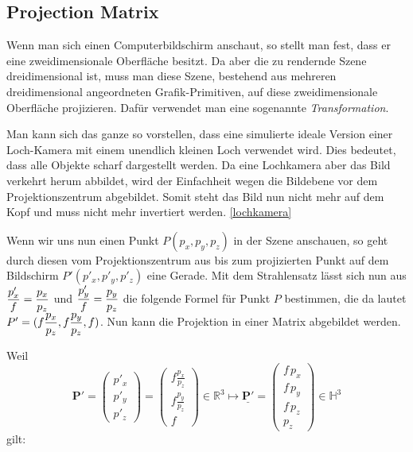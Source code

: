 \subsection{Projection Matrix}
\label{Sec:Projection}
Wenn man sich einen Computerbildschirm anschaut, so stellt man fest, dass er eine zweidimensionale Oberfläche besitzt. 
Da aber die zu rendernde Szene dreidimensional ist, muss man diese Szene, bestehend aus mehreren dreidimensional angeordneten Grafik-Primitiven, auf diese zweidimensionale Oberfläche projizieren. Dafür verwendet man eine sogenannte \textit{Transformation}.

Man kann sich das ganze so vorstellen, dass eine simulierte ideale Version einer Loch-Kamera mit einem unendlich kleinen Loch verwendet wird. Dies bedeutet, dass alle Objekte scharf dargestellt werden. Da eine Lochkamera aber das Bild verkehrt herum abbildet, wird der Einfachheit wegen die Bildebene vor dem Projektionszentrum abgebildet. Somit steht das Bild nun nicht mehr auf dem Kopf und muss nicht mehr invertiert werden. \cref{lochkamera}

Wenn wir uns nun einen Punkt $P(p_{x}, p_{y}, p_{z})$ in der Szene anschauen, so geht durch diesen vom Projektionszentrum aus bis zum projizierten Punkt auf dem Bildschirm $P'(p'_{x}, p'_{y}, p'_{z})$ eine Gerade. Mit dem Strahlensatz lässt sich nun aus $\dfrac{p'_{x}}{\mathnormal{f}} = \dfrac{p_{x}}{p_{z}} $ und $ \dfrac{p'_{y}}{\mathnormal{f}} = \dfrac{p_{y}}{p_{z}} $ die folgende Formel für Punkt $P$ bestimmen, die da lautet $P'=(\mathnormal{f}\dfrac{p_{x}}{p_{z}}, \mathnormal{f}\dfrac{p_{y}}{p_{z}}, \mathnormal{f})$.
Nun kann die Projektion in einer Matrix abgebildet werden.

Weil $$\mathbf{P'}= \begin{pmatrix} p'_x \\ p'_y \\ p'_z \end{pmatrix}= \begin{pmatrix} f
\frac{p_x}{p_z}\\ f \frac{p_y}{p_z}\\ f \end{pmatrix} \in \mathbb{R}^3 \longmapsto \underline{\mathbf{P'}}= \begin{pmatrix}f \, p_x \\f \, p_y \\ f \, p_z\\
p_z\end{pmatrix} \in \mathbb{H}^3 $$
gilt:	


